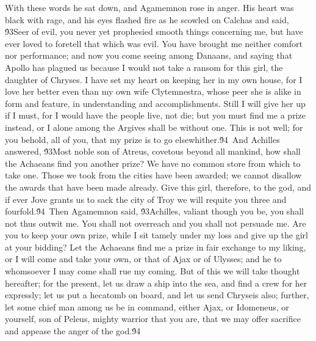 {With these words he sat down, and Agamemnon rose in anger. His heart was black with rage, and his eyes flashed fire as he scowled on Calchas and said, \'93Seer of evil, you never yet prophesied smooth things concerning me, but have ever loved to foretell that which was evil. You have brought me neither comfort nor performance; and now you come seeing among Danaans, and saying that Apollo has plagued us because I would not take a ransom for this girl, the daughter of Chryses. I have set my heart on keeping her in my own house, for I love her better even than my own wife Clytemnestra, whose peer she is alike in form and feature, in understanding and accomplishments. Still I will give her up if I must, for I would have the people live, not die; but you must find me a prize instead, or I alone among the Argives shall be without one. This is not well; for you behold, all of you, that my prize is to go elsewhither.\'94\
And Achilles answered, \'93Most noble son of Atreus, covetous beyond all mankind, how shall the Achaeans find you another prize? We have no common store from which to take one. Those we took from the cities have been awarded; we cannot disallow the awards that have been made already. Give this girl, therefore, to the god, and if ever Jove grants us to sack the city of Troy we will requite you three and fourfold.\'94\
Then Agamemnon said, \'93Achilles, valiant though you be, you shall not thus outwit me. You shall not overreach and you shall not persuade me. Are you to keep your own prize, while I sit tamely under my loss and give up the girl at your bidding? Let the Achaeans find me a prize in fair exchange to my liking, or I will come and take your own, or that of Ajax or of Ulysses; and he to whomsoever I may come shall rue my coming. But of this we will take thought hereafter; for the present, let us draw a ship into the sea, and find a crew for her expressly; let us put a hecatomb on board, and let us send Chryseis also; further, let some chief man among us be in command, either Ajax, or Idomeneus, or yourself, son of Peleus, mighty warrior that you are, that we may offer sacrifice and appease the anger of the god.\'94\
}
